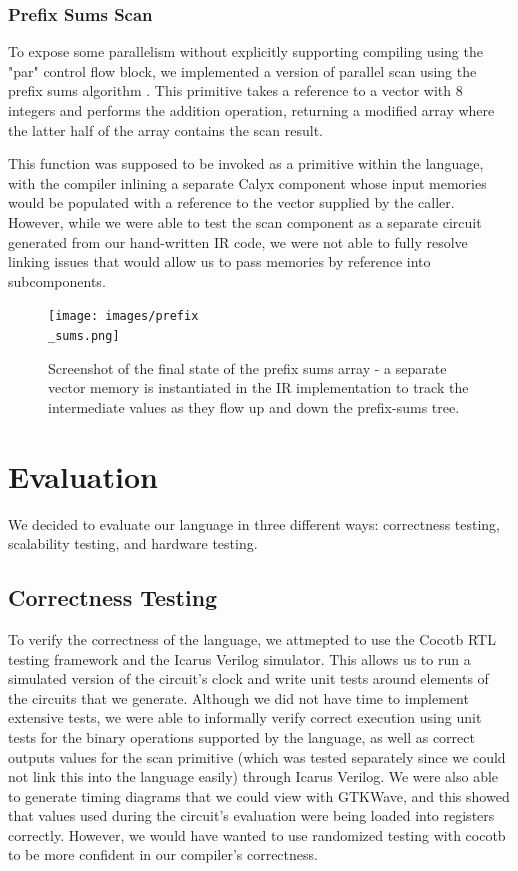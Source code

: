 \documentclass[12pt]{article}
\begin{document}
\subsubsection{Prefix Sums Scan}
To expose some parallelism without explicitly supporting compiling using the "par" control flow block,
we implemented a version of parallel scan using the prefix sums algorithm \cite{blelloch_prefix_1990}. This primitive takes
a reference to a vector with 8 integers and performs the addition operation, returning a modified
array where the latter half of the array contains the scan result.

This function was supposed to be invoked as a primitive within the language, with the compiler inlining
a separate Calyx component whose input memories would be populated with a reference to the vector supplied
by the caller. However, while we were able to test the scan component as a separate circuit generated from our
hand-written IR code, we were not able to fully resolve linking issues that would allow us to pass memories by
reference into subcomponents.

\begin{figure}[H]
    \centering
    \texttt{[image: images/prefix\\\_sums.png]}
    \caption{Screenshot of the final state of the prefix sums array - a separate vector memory
    is instantiated in the IR implementation to track the intermediate values as they flow
    up and down the prefix-sums tree.}
\end{figure}

\section{Evaluation}
We decided to evaluate our language in three different ways: correctness testing, scalability testing, and hardware testing.
\subsection{Correctness Testing}
To verify the correctness of the language, we attmepted to use the Cocotb RTL testing framework and the Icarus Verilog simulator. This allows
us to run a simulated version of the circuit's clock and write unit tests around elements of the circuits
that we generate. Although we did not have time to implement extensive tests, we were able to informally verify
correct execution using unit tests for the binary operations supported by the language,
as well as correct outputs values for the scan primitive (which was tested separately since we could not link
this into the language easily) through Icarus Verilog. We were also able to generate timing diagrams that we
could view with GTKWave, and this showed that values used during the circuit's evaluation were being loaded into registers correctly.
However, we would have wanted to use randomized testing with cocotb to be more confident in our compiler's correctness.
\end{document}
